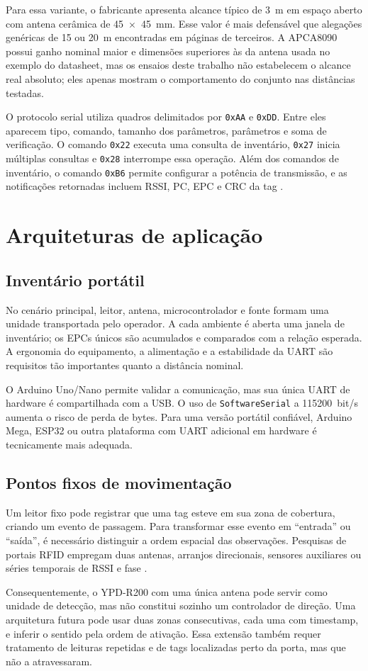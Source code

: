 Para essa variante, o fabricante apresenta alcance típico de 3~m em espaço aberto com antena cerâmica de 45~$\times$~45~mm. Esse valor é mais defensável que alegações genéricas de 15 ou 20~m encontradas em páginas de terceiros. A APCA8090 possui ganho nominal maior e dimensões superiores às da antena usada no exemplo do datasheet, mas os ensaios deste trabalho não estabelecem o alcance real absoluto; eles apenas mostram o comportamento do conjunto nas distâncias testadas.

O protocolo serial utiliza quadros delimitados por \texttt{0xAA} e \texttt{0xDD}. Entre eles aparecem tipo, comando, tamanho dos parâmetros, parâmetros e soma de verificação. O comando \texttt{0x22} executa uma consulta de inventário, \texttt{0x27} inicia múltiplas consultas e \texttt{0x28} interrompe essa operação. Além dos comandos de inventário, o comando \texttt{0xB6} permite configurar a potência de transmissão, e as notificações retornadas incluem RSSI, PC, EPC e CRC da tag \cite{yanpodo2016protocol}.

\section{Arquiteturas de aplicação}

\subsection{Inventário portátil}

No cenário principal, leitor, antena, microcontrolador e fonte formam uma unidade transportada pelo operador. A cada ambiente é aberta uma janela de inventário; os EPCs únicos são acumulados e comparados com a relação esperada. A ergonomia do equipamento, a alimentação e a estabilidade da UART são requisitos tão importantes quanto a distância nominal.

O Arduino Uno/Nano permite validar a comunicação, mas sua única UART de hardware é compartilhada com a USB. O uso de \texttt{SoftwareSerial} a 115200~bit/s aumenta o risco de perda de bytes. Para uma versão portátil confiável, Arduino Mega, ESP32 ou outra plataforma com UART adicional em hardware é tecnicamente mais adequada.

\subsection{Pontos fixos de movimentação}

Um leitor fixo pode registrar que uma tag esteve em sua zona de cobertura, criando um evento de passagem. Para transformar esse evento em ``entrada'' ou ``saída'', é necessário distinguir a ordem espacial das observações. Pesquisas de portais RFID empregam duas antenas, arranjos direcionais, sensores auxiliares ou séries temporais de RSSI e fase \cite{wang2022rfaccess}.

Consequentemente, o YPD-R200 com uma única antena pode servir como unidade de detecção, mas não constitui sozinho um controlador de direção. Uma arquitetura futura pode usar duas zonas consecutivas, cada uma com timestamp, e inferir o sentido pela ordem de ativação. Essa extensão também requer tratamento de leituras repetidas e de tags localizadas perto da porta, mas que não a atravessaram.
